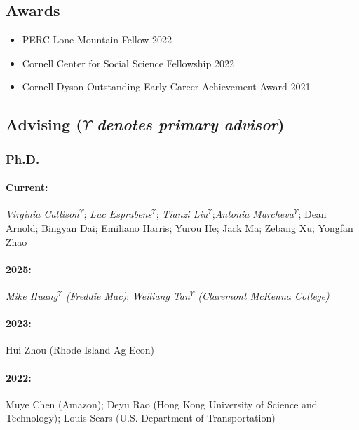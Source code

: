 \documentclass[11pt]{res} %
\begin{document}
\begin{resume}
\subsection{Awards}
\begin{itemize} \itemsep -1pt
	\item[] PERC Lone Mountain Fellow \hfill 2022
	\item[] Cornell Center for Social Science Fellowship \hfill 2022
	\item[] Cornell Dyson Outstanding Early Career Achievement Award \hfill 2021
\end{itemize}

\vspace{-.2in}

\subsection{Advising ($\Upsilon$ \textit{denotes primary advisor})  }
\vspace{-.2in}
 
\subsubsection{Ph.D.}\vspace{-.2in}
\paragraph{Current:} \textit{Virginia Callison}$^\Upsilon$; \textit{Luc Esprabens}$^\Upsilon$; \textit{Tianzi Liu}$^\Upsilon$;\textit{Antonia Marcheva}$^\Upsilon$; Dean Arnold; Bingyan Dai; Emiliano Harris; Yurou He; Jack Ma; Zebang Xu; Yongfan Zhao
\vspace{-.35in}
\paragraph{2025:} \textit{{Mike Huang}$^\Upsilon$ (Freddie Mac)}; \textit{Weiliang Tan$^\Upsilon$ (Claremont McKenna College)}
\vspace{-.35in}
\paragraph{2023:} Hui Zhou (Rhode Island Ag Econ)
\vspace{-.35in}
\paragraph{2022:} Muye Chen (Amazon); Deyu Rao (Hong Kong University of Science and Technology); Louis Sears (U.S. Department of Transportation)
\vspace{-.35in}

\end{resume}
\end{document}
